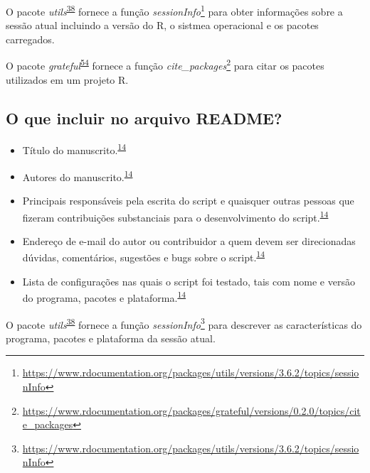 \documentclass[
  a4paper,
]{book}
\renewcommand{\href}[2]{#2\footnote{\url{#1}}}
\newenvironment{infobox}[1]
  {
  \begin{itemize}
  \renewcommand{\labelitemi}{
    \raisebox{-.7\height}[0pt][0pt]{
      {\setkeys{Gin}{width=3em,keepaspectratio}
        \texttt{[image: \#1]}}
    }
  }
  \setlength{\fboxsep}{1em}
  \begin{blackbox}
  \item
  }
  {
  \end{blackbox}
  \end{itemize}
  }
\begin{document}
\begin{infobox}{images/Rlogo}
O pacote \emph{utils}\textsuperscript{\protect\hyperlink{ref-utils}{38}} fornece a função \href{https://www.rdocumentation.org/packages/utils/versions/3.6.2/topics/sessionInfo}{\emph{sessionInfo}} para obter informações sobre a sessão atual incluindo a versão do R, o sistmea operacional e os pacotes carregados.

\end{infobox}

\begin{infobox}{images/Rlogo}
O pacote \emph{grateful}\textsuperscript{\protect\hyperlink{ref-grateful}{54}} fornece a função \href{https://www.rdocumentation.org/packages/grateful/versions/0.2.0/topics/cite_packages}{\emph{cite\_packages}} para citar os pacotes utilizados em um projeto R.

\end{infobox}

\hypertarget{o-que-incluir-no-arquivo-readme}{%
\subsection{O que incluir no arquivo README?}\label{o-que-incluir-no-arquivo-readme}}

\begin{itemize}
\item
  Título do manuscrito.\textsuperscript{\protect\hyperlink{ref-hofner2015}{14}}
\item
  Autores do manuscrito.\textsuperscript{\protect\hyperlink{ref-hofner2015}{14}}
\item
  Principais responsáveis pela escrita do script e quaisquer outras pessoas que fizeram contribuições substanciais para o desenvolvimento do script.\textsuperscript{\protect\hyperlink{ref-hofner2015}{14}}
\item
  Endereço de e-mail do autor ou contribuidor a quem devem ser direcionadas dúvidas, comentários, sugestões e bugs sobre o script.\textsuperscript{\protect\hyperlink{ref-hofner2015}{14}}
\item
  Lista de configurações nas quais o script foi testado, tais com nome e versão do programa, pacotes e plataforma.\textsuperscript{\protect\hyperlink{ref-hofner2015}{14}}
\end{itemize}

\begin{infobox}{images/Rlogo}
O pacote \emph{utils}\textsuperscript{\protect\hyperlink{ref-utils}{38}} fornece a função \href{https://www.rdocumentation.org/packages/utils/versions/3.6.2/topics/sessionInfo}{\emph{sessionInfo}} para descrever as características do programa, pacotes e plataforma da sessão atual.

\end{infobox}
\end{document}
